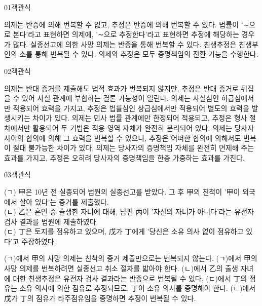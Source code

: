 \documentclass[fs85,seriesWit]{korfarm-base}
\begin{document}
\kfBeginMC
\begin{kfQBlock}{01}{객관식}
\begin{kfChoices}
\kfChoice 의제는 반증에 의해 번복할 수 없고, 추정은 반증에 의해 번복할 수 있다.
\kfChoice 법률이 '∼으로 본다'라고 표현하면 의제에, '∼으로 추정한다'라고 표현하면 추정에 해당하는 경우가 많다.
\kfChoice 실종선고에 의한 사망 의제는 반증을 통해 번복할 수 있다.
\kfChoice 친생추정은 친생부인의 소를 통해 번복될 수 있다.
\kfChoice 의제와 추정은 모두 증명책임의 전환 기능을 수행한다.
\end{kfChoices}
\end{kfQBlock}

\begin{kfQBlock}{02}{객관식}
\begin{kfChoices}
\kfChoice 의제는 반대 증거를 제출해도 법적 효과가 번복되지 않지만, 추정은 반대 증거로 뒤집을 수 있어 사실 관계에 부합하는 결론 가능성이 열린다.
\kfChoice 의제는 사실심인 하급심에서만 적용되어 효력을 가지고, 추정은 법률심인 상급심에서만 적용되어 별도의 효력을 발생시키는 차이가 있다.
\kfChoice 의제는 민사 법률 관계에만 한정되어 적용되고, 추정은 형사 절차에서만 활용되어 두 기법은 적용 영역 자체가 완전히 분리되어 있다.
\kfChoice 의제는 당사자 사이의 합의에 의해 그 효력을 번복할 수 있으나, 추정은 어떠한 합의에 의해서도 번복이 절대 불가능한 차이가 있다.
\kfChoice 의제는 당사자의 증명책임 자체를 완전히 면제해 주는 효과를 가지고, 추정은 오히려 당사자의 증명책임을 한층 가중하는 효과를 가진다.
\end{kfChoices}
\end{kfQBlock}

\begin{kfQBlock}{03}{객관식}
\begin{kfEvidence}(ㄱ) 甲은 10년 전 실종되어 법원의 실종선고를 받았다. 그 후 甲의 친척이 '甲이 외국에서 살아 있다'는 증거를 제출했다. \\\relax
(ㄴ) 乙은 혼인 중 출생한 자녀에 대해, 남편 丙이 '자신의 자녀가 아니다'라는 유전자 검사 결과를 법원에 제출하였다. \\\relax
(ㄷ) 丁은 토지를 점유하고 있으며, 戊가 丁에게 '당신은 소유 의사 없이 점유하고 있다'고 주장하였다.\end{kfEvidence}
\begin{kfChoices}
\kfChoice (ㄱ)에서 甲의 사망 의제는 친척의 증거 제출만으로는 번복되지 않는다.
\kfChoice (ㄱ)에서 甲의 사망 의제를 번복하려면 실종선고 취소 절차를 밟아야 한다.
\kfChoice (ㄴ)에서 乙의 출생 자녀에 대한 친생추정은 유전자 검사 결과라는 반증으로 번복될 수 있다.
\kfChoice (ㄷ)에서 丁의 점유는 소유 의사에 의한 점유로 추정되므로, 丁이 소유 의사를 증명해야 한다.
\kfChoice (ㄷ)에서 戊가 丁의 점유가 타주점유임을 증명하면 추정이 번복될 수 있다.
\end{kfChoices}
\end{kfQBlock}
\end{document}
